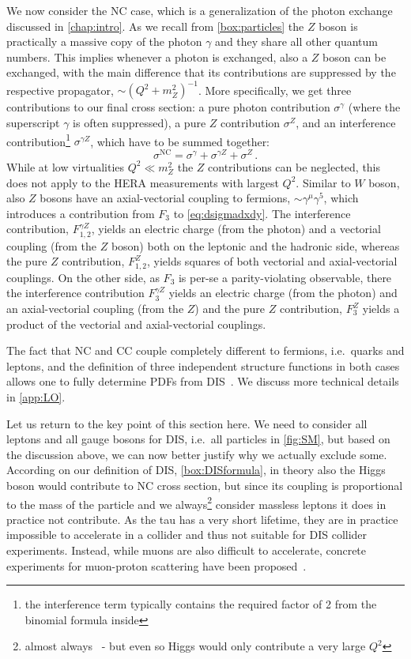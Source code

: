 We now consider the NC case, which is a generalization of the photon exchange discussed in \cref{chap:intro}.
As we recall from \cref{box:particles} the $Z$ boson is practically a massive copy of the photon $\gamma$ and they share all other quantum numbers.
This implies whenever a photon is exchanged, also a $Z$ boson can be exchanged, with the main difference that its contributions are suppressed by the respective propagator, $\sim (Q^2 + m_Z^2)^{-1}$.
More specifically, we get three contributions to our final cross section: a pure photon contribution $\sigma^\gamma$ (where the superscript $\gamma$ is often suppressed), a pure $Z$ contribution $\sigma^Z$, and an interference contribution\footnote{the interference term typically contains the required factor of 2 from the binomial formula inside} $\sigma^{\gamma Z}$, which have to be summed together:
\begin{equation}
    \sigma^\text{NC} = \sigma^\gamma + \sigma^{\gamma Z} + \sigma^{Z}\,.
\end{equation}
While at low virtualities $Q^2 \ll m_Z^2$ the $Z$ contributions can be neglected, this does not apply to the HERA measurements with largest $Q^2$.
Similar to $W$ boson, also $Z$ bosons have an axial-vectorial coupling to fermions, $\sim \gamma^\mu\gamma^5$, which introduces a contribution from $F_3$ to \cref{eq:dsigmadxdy}.
The interference contribution, $F_{1,2}^{\gamma Z}$, yields an electric charge (from the photon) and a vectorial coupling (from the $Z$ boson) both on the leptonic and the hadronic side, whereas the pure $Z$ contribution, $F_{1,2}^Z$, yields squares of both vectorial and axial-vectorial couplings.
On the other side, as $F_3$ is per-se a parity-violating observable, there the interference contribution $F_3^{\gamma Z}$ yields an electric charge (from the photon) and an axial-vectorial coupling (from the $Z$) and the pure $Z$ contribution, $F_3^Z$ yields a product of the vectorial and axial-vectorial couplings.

The fact that NC and CC couple completely different to fermions, i.e.\ quarks and leptons, and the definition of three independent structure functions in both cases allows one to fully determine PDFs from DIS~\cite{Lappi:2024dvv}.
We discuss more technical details in \cref{app:LO}.

Let us return to the key point of this section here.
We need to consider all leptons and all gauge bosons for DIS, i.e.\ all particles in \cref{fig:SM}, but based on the discussion above, we can now better justify why we actually exclude some.
According on our definition of DIS, \cref{box:DISformula}, in theory also the Higgs boson would contribute to NC cross section, but since its coupling is proportional to the mass of the particle and we always\footnote{almost always~\cite{Spezzano:2025rfy} - but even so Higgs would only contribute a very large $Q^2$} consider massless leptons it does in practice not contribute.
As the tau has a very short lifetime, they are in practice impossible to accelerate in a collider and thus not suitable for DIS collider experiments.
Instead, while muons are also difficult to accelerate, concrete experiments for muon-proton scattering have been proposed~\cite{Akturk:2025ubm}.


